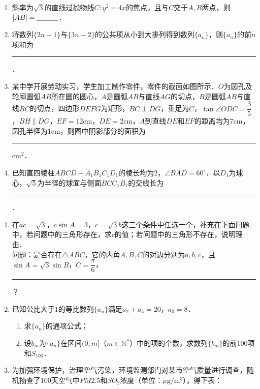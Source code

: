 \begin{description}
\begin{enumerate}[leftmargin=5pt]
\begin{enumerate}[label=\Alph*.]
        \end{enumerate}
    \end{enumerate}
    \item[三、填空题]
    \begin{enumerate}[leftmargin=5pt]
      \addtocounter{enumi}{+12}
        \item 斜率为$\sqrt{3}$的直线过抛物线$C:y^{2}=4x$的焦点，且与$C$交于$A,B$两点，则$|AB|=\rule[-0.3ex]{3em}{0.4pt}$．
        \item 将数列$\{2n-1\}$与$\{3n-2\}$的公共项从小到大排列得到数列$\{a_{n}\}$，则$\{a_{n}\}$的前$n$项和为\rule[-0.3ex]{6em}{0.4pt}．        \item 某中学开展劳动实习，学生加工制作零件，零件的截面如图所示．$O$为圆孔及轮廓圆弧$AB$所在圆的圆心，$A$是圆弧$AB$与直线$AG$的切点，$B$是圆弧$AB$与直线$BC$的切点，四边形$DEFG$为矩形，$BC\perp DG$，垂足为$C$，$\tan\angle ODC=\dfrac{3}{5}$，$BH\parallel DG$，$EF=12\text{cm}$，$DE=2\text{cm}$，$A$到直线$DE$和$EF$的距离均为$7\text{cm}$，圆孔半径为$1\text{cm}$，则图中阴影部分的面积为\rule[-0.3ex]{6em}{0.4pt} $\text{cm}^{2}$．
        \item 已知直四棱柱$ABCD-A_{1}B_{1}C_{1}D_{1}$的棱长均为$2$，$\angle BAD=60^{\circ}$．以$D_{1}$为球心，$\sqrt{5}$为半径的球面与侧面$BCC_{1}B_{1}$的交线长为\rule[-0.3ex]{3em}{0.4pt}．
    \end{enumerate}
    \item[四、解答题]
    \begin{enumerate}[leftmargin=5pt]
      \addtocounter{enumi}{+16}
        \item 在$ac=\sqrt{3}$，$c\sin A=3$，$c=\sqrt{3}b$这三个条件中任选一个，补充在下面问题中，若问题中的三角形存在，求$c$的值；若问题中的三角形不存在，说明理由．\\
        问题：是否存在$\triangle ABC$，它的内角$A,B,C$的对边分别为$a,b,c$，且$\sin A=\sqrt{3}\sin B$，$C=\dfrac{\pi}{6}$，\rule[-0.3ex]{3em}{0.4pt}？
        \item 已知公比大于$1$的等比数列$\{a_{n}\}$满足$a_{2}+a_{4}=20$，$a_{3}=8$．
        \begin{enumerate}[label=(\arabic*)]
            \item 求$\{a_{n}\}$的通项公式；
            \item 设$b_{m}$为$\{a_{n}\}$在区间$(0,m]$（$m\in\mathbb{N}^{*}$）中的项的个数，求数列$\{b_{m}\}$的前$100$项和$S_{100}$．
        \end{enumerate}        \item 为加强环境保护，治理空气污染，环境监测部门对某市空气质量进行调查，随机抽查了$100$天空气中$PM2.5$和$SO_{2}$浓度（单位：$\mu\text{g}/\text{m}^{3}$），得下表：\\

\end{enumerate}
\end{description}
